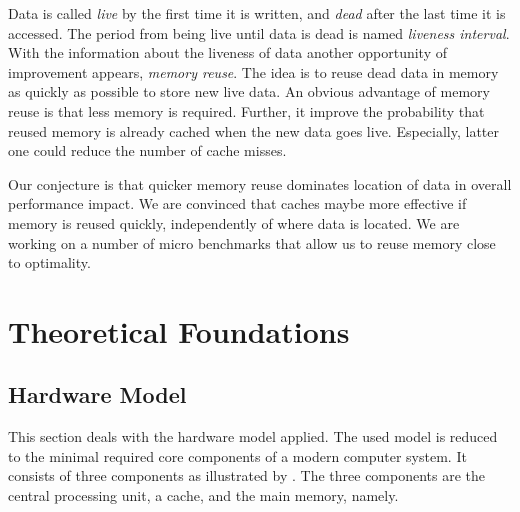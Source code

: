 \documentclass[onecolumn, openright, master, english, signatures]{dbrgrptt}
\begin{document}
Data is called \emph{live} by the first time it is written, and \emph{dead} after the last time it is accessed. The period from being live until data is dead is named \emph{liveness interval}. With the information about the liveness of data another opportunity of improvement appears, \emph{memory reuse}. The idea is to reuse dead data in memory as quickly as possible to store new live data. An obvious advantage of memory reuse is that less memory is required. Further, it improve the probability that reused memory is already cached when the new data goes live. Especially, latter one could reduce the number of cache misses.

Our conjecture is that quicker memory reuse dominates location of data in overall performance impact. We are convinced that caches maybe more effective if memory is reused quickly, independently of where data is located. We are  working on a number of micro benchmarks that allow us to reuse memory close to optimality.


\chapter{Theoretical Foundations}\label{cha:theoretical-foundations}


\section{Hardware Model}\label{sec:hardware-model}

This section deals with the hardware model applied. The used model is reduced to the minimal required core components of a modern computer system. It consists of three components as illustrated by . The three components are the central processing unit, a cache, and the main memory, namely.
\end{document}

